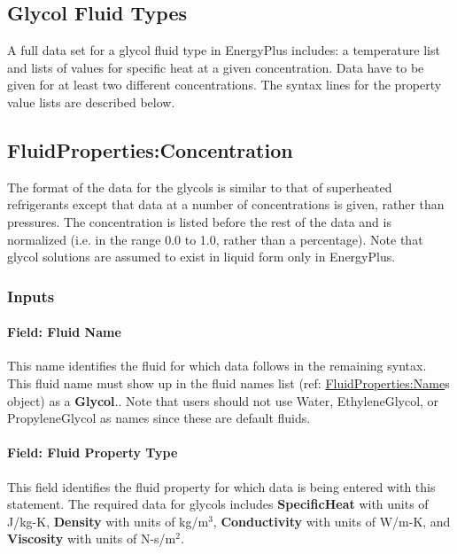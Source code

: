 \subsection{Glycol Fluid Types}\label{glycol-fluid-types}

A full data set for a glycol fluid type in EnergyPlus includes: a temperature list and lists of values for specific heat at a given concentration. Data have to be given for at least two different concentrations. The syntax lines for the property value lists are described below.

\subsection{FluidProperties:Concentration}\label{fluidpropertiesconcentration}

The format of the data for the glycols is similar to that of superheated refrigerants except that data at a number of concentrations is given, rather than pressures. The concentration is listed before the rest of the data and is normalized (i.e. in the range 0.0 to 1.0, rather than a percentage). Note that glycol solutions are assumed to exist in liquid form only in EnergyPlus.

\subsubsection{Inputs}\label{inputs-5-012}

\paragraph{Field: Fluid Name}\label{field-fluid-name-2}

This name identifies the fluid for which data follows in the remaining syntax. This fluid name must show up in the fluid names list (ref: \hyperref[fluidpropertiesname]{FluidProperties:Name}s object) as a \textbf{Glycol}.. Note that users should not use Water, EthyleneGlycol, or PropyleneGlycol as names since these are default fluids.

\paragraph{Field: Fluid Property Type}\label{field-fluid-property-type-2}

This field identifies the fluid property for which data is being entered with this statement. The required data for glycols includes \textbf{SpecificHeat} with units of J/kg-K, \textbf{Density} with units of kg/m\(^{3}\), \textbf{Conductivity} with units of W/m-K, and \textbf{Viscosity} with units of N-s/m\(^{2}\).

